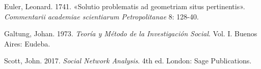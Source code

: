\documentclass[
  letterpaper,
  DIV=11,
  numbers=noendperiod]{scrreprt}
\newlength{\cslhangindent}
\newlength{\cslentryspacingunit} %
\newenvironment{CSLReferences}[2] %
 {%
  \setlength{\parindent}{0pt}
  \ifodd #1
  \let\oldpar\par
  \def\par{\hangindent=\cslhangindent\oldpar}
  \fi
  \setlength{\parskip}{#2\cslentryspacingunit}
 }%
 {}
\begin{document}

\hypertarget{refs}{}
\begin{CSLReferences}{1}{0}
\leavevmode{}%
Euler, Leonard. 1741. {«Solutio problematis ad geometriam situs
pertinentis»}. \emph{Commentarii academiae scientiarum Petropolitanae}
8: 128-40.

\leavevmode{}%
Galtung, Johan. 1973. \emph{Teoría y Método de la Investigación Social}.
Vol. I. Buenos Aires: Eudeba.

\leavevmode{}%
Scott, John. 2017. \emph{Social Network Analysis}. 4th ed. London: Sage
Publications.

\end{CSLReferences}
\end{document}
